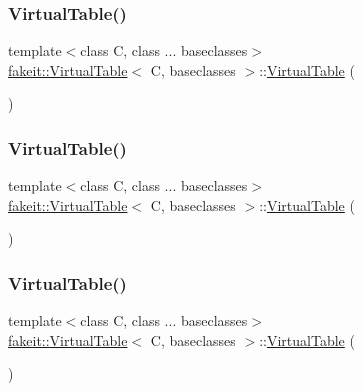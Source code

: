 \subsubsection{\texorpdfstring{VirtualTable()}{VirtualTable()}\hspace{0.1cm}{\footnotesize\ttfamily [4/10]}}
{\footnotesize\ttfamily template$<$class C, class ... baseclasses$>$ \\
\mbox{\hyperlink{structfakeit_1_1VirtualTable}{fakeit\+::\+Virtual\+Table}}$<$ C, baseclasses $>$\+::\mbox{\hyperlink{structfakeit_1_1VirtualTable}{Virtual\+Table}} (\begin{DoxyParamCaption}{ }\end{DoxyParamCaption})\hspace{0.3cm}{\ttfamily [inline]}}

\mbox{\label{structfakeit_1_1VirtualTable_ae64da18818c25b107d8f9f2c615c4c37}} 
\subsubsection{\texorpdfstring{VirtualTable()}{VirtualTable()}\hspace{0.1cm}{\footnotesize\ttfamily [5/10]}}
{\footnotesize\ttfamily template$<$class C, class ... baseclasses$>$ \\
\mbox{\hyperlink{structfakeit_1_1VirtualTable}{fakeit\+::\+Virtual\+Table}}$<$ C, baseclasses $>$\+::\mbox{\hyperlink{structfakeit_1_1VirtualTable}{Virtual\+Table}} (\begin{DoxyParamCaption}{ }\end{DoxyParamCaption})\hspace{0.3cm}{\ttfamily [inline]}}

\mbox{\label{structfakeit_1_1VirtualTable_ae64da18818c25b107d8f9f2c615c4c37}} 
\subsubsection{\texorpdfstring{VirtualTable()}{VirtualTable()}\hspace{0.1cm}{\footnotesize\ttfamily [6/10]}}
{\footnotesize\ttfamily template$<$class C, class ... baseclasses$>$ \\
\mbox{\hyperlink{structfakeit_1_1VirtualTable}{fakeit\+::\+Virtual\+Table}}$<$ C, baseclasses $>$\+::\mbox{\hyperlink{structfakeit_1_1VirtualTable}{Virtual\+Table}} (\begin{DoxyParamCaption}{ }\end{DoxyParamCaption})\hspace{0.3cm}{\ttfamily [inline]}}

